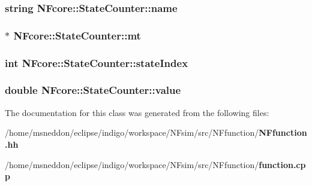 \subsubsection{\setlength{\rightskip}{0pt plus 5cm}string {\bf NFcore::StateCounter::name}}\label{classNFcore_1_1StateCounter_f33e6c1ac6e69d74b24f6b9ca3238193}


\subsubsection{$\ast$ {\bf NFcore::StateCounter::mt}}\label{classNFcore_1_1StateCounter_415dd923cb75e9da42f3f5ca44bcee49}


\subsubsection{\setlength{\rightskip}{0pt plus 5cm}int {\bf NFcore::StateCounter::stateIndex}}\label{classNFcore_1_1StateCounter_0b039d4ee92aae9dd6b841f8cea13cd3}


\subsubsection{\setlength{\rightskip}{0pt plus 5cm}double {\bf NFcore::StateCounter::value}}\label{classNFcore_1_1StateCounter_c170ba269add82d4722bc386b3532bdb}




The documentation for this class was generated from the following files:\begin{CompactItemize}
\item 
/home/msneddon/eclipse/indigo/workspace/NFsim/src/NFfunction/{\bf NFfunction.hh}\item 
/home/msneddon/eclipse/indigo/workspace/NFsim/src/NFfunction/{\bf function.cpp}\end{CompactItemize}
